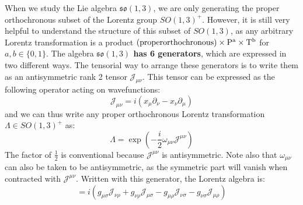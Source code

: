 \documentclass[11pt, oneside]{article}   	%
\theoremstyle{definition}
\begin{document}
When we study the Lie algebra $\mathfrak{so}(1, 3)$, we are only generating the proper orthochronous subset of the Lorentz group $SO(1, 
3)^+$. However, it is still very helpful to understand the structure of this subset of $SO(1, 3)$, as any arbitrary Lorentz transformation is a 
product $(\rm{proper orthochronous})\times P^a \times T^b$ for $a, b\in \{0, 1\}$. The algebra \textbf{$\mathfrak{so}(1, 3)$ has 6 generators}, 
which are expressed in two different ways. The tensorial way to arrange these generators is to write them as an antisymmetric rank 2 tensor 
$\mathcal J_{\mu\nu}$. This tensor can be expressed as the following operator acting on wavefunctions:
\begin{equation}
	\mathcal{J}_{\mu\nu} = i(x_\mu\partial_\nu - x_\nu\partial_\mu)
\end{equation}
and we can thus write any proper orthochronous Lorentz transformation $\Lambda\in SO(1, 3)^+$ as:
\begin{equation}
	\Lambda = \exp\left(-\frac{i}{2}\omega_{\mu\nu}\mathcal J^{\mu\nu}\right)
\end{equation}
The factor of $\frac{1}{2}$ is conventional because $\mathcal J^{\mu\nu}$ is antisymmetric. Note also that $\omega_{\mu\nu}$ can also 
be taken to be antisymmetric, as the symmetric part will vanish when contracted with $\mathcal J^{\mu\nu}$. Written with this generator, 
the Lorentz algebra is:
\begin{equation}
	[\mathcal J_{\mu\nu}, \mathcal J_{\rho\sigma}] = i(g_{\mu\sigma}\mathcal J_{\nu\rho} + g_{\nu\rho}\mathcal J_{\mu\sigma} - 
	g_{\mu\rho} \mathcal J_{\nu\sigma} - g_{\nu\sigma}\mathcal J_{\mu\rho})
\end{equation}
\end{document}
